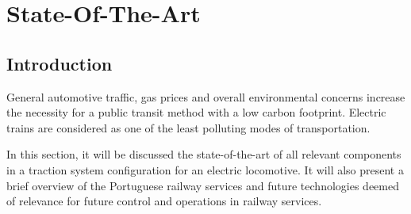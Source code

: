 \chapter{State-Of-The-Art} \label{chap:sota}

\section{Introduction}\label{sec:sota_intro}
General automotive traffic, gas prices and overall environmental concerns increase the necessity for a public transit method with a low carbon footprint. Electric trains are considered as one of the least polluting modes of transportation.

In this section, it will be discussed the state-of-the-art of all relevant components in a traction system configuration for an electric locomotive. It will also present a brief overview of the Portuguese railway services and future technologies deemed of relevance for future control and operations in railway services.

